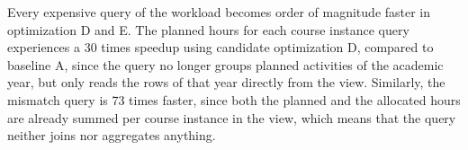 \documentclass[a4paper]{scrartcl}
\renewcommand{\_}{\textunderscore\allowbreak}
\begin{document}
Every expensive query of the workload becomes order of magnitude faster in optimization D and E. The planned hours for each course instance query experiences a 30 times speedup using candidate optimization D, compared to baseline A, since the query no longer groups planned activities of the academic year, but only reads the rows of that year directly from the view. Similarly, the mismatch query is 73 times faster, since both the planned and the allocated hours are already summed per course instance in the view, which means that the query neither joins nor aggregates anything.




\end{document}
